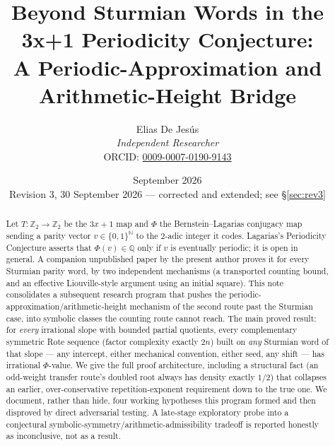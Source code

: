 \documentclass[11pt]{article}
\title{Beyond Sturmian Words in the 3x+1 Periodicity Conjecture:\\
A Periodic-Approximation and Arithmetic-Height Bridge}
\author{Elias De Jesús\\
\textit{Independent Researcher}\\
ORCID: \href{https://orcid.org/0009-0007-0190-9143}{0009-0007-0190-9143}}
\date{September 2026 \\[2pt] \textnormal{\small Revision 3, 30 September 2026 --- corrected and extended; see \S\ref{sec:rev3}}}
\newcommand{\Q}{\mathbb{Q}}
\newcommand{\Z}{\mathbb{Z}}
\newcommand{\N}{\mathbb{N}}
\begin{document}
\sloppy
\maketitle

\begin{abstract}
Let $T:\Z_2\to\Z_2$ be the $3x+1$ map and $\Phi$ the Bernstein--Lagarias conjugacy map sending a parity vector $v\in\{0,1\}^\N$ to the 2-adic integer it codes. Lagarias's Periodicity Conjecture asserts that $\Phi(v)\in\Q$ only if $v$ is eventually periodic; it is open in general. A companion unpublished paper by the present author proves it for every Sturmian parity word, by two independent mechanisms (a transported counting bound, and an effective Liouville-style argument using an initial square). This note consolidates a subsequent research program that pushes the periodic-approximation/arithmetic-height mechanism of the second route past the Sturmian case, into symbolic classes the counting route cannot reach. The main proved result: for \emph{every} irrational slope with bounded partial quotients, every complementary symmetric Rote sequence (factor complexity exactly $2n$) built on \emph{any} Sturmian word of that slope --- any intercept, either mechanical convention, either seed, any shift --- has irrational $\Phi$-value. We give the full proof architecture, including a structural fact (an odd-weight transfer route's doubled root always has density exactly $1/2$) that collapses an earlier, over-conservative repetition-exponent requirement down to the true one. We document, rather than hide, four working hypotheses this program formed and then disproved by direct adversarial testing. A late-stage exploratory probe into a conjectural symbolic-symmetry/arithmetic-admissibility tradeoff is reported honestly as inconclusive, not as a result.


\end{abstract}
\end{document}
